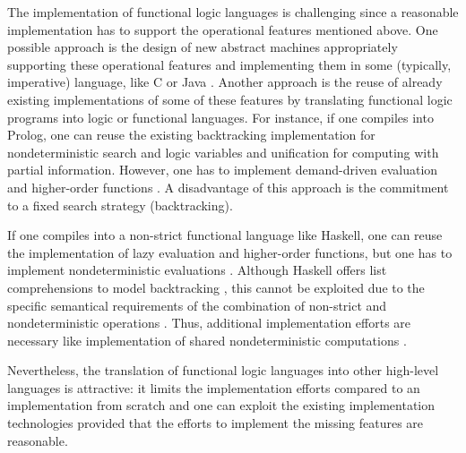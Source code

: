 \documentclass{llncs}
\begin{document}
The implementation of functional logic languages is challenging
since a reasonable implementation has to support the operational
features mentioned above.
One possible approach
is the design of new abstract machines appropriately supporting
these operational features and implementing them in some (typically,
imperative) language, like C \cite{Lux99FLOPS}
or Java \cite{AntoyHanusLiuTolmach05,HanusSadre99JFLP}.
Another approach is the reuse of already existing implementations
of some of these features by translating
functional logic programs into logic or functional languages.
For instance, if one compiles into Prolog, one can reuse
the existing backtracking implementation for nondeterministic
search and logic variables and unification for computing with partial
information. However, one has to implement demand-driven evaluation
and higher-order functions \cite{AntoyHanus00FROCOS}.
A disadvantage of this approach is the commitment to a fixed
search strategy (backtracking).

If one compiles into a non-strict functional language like Haskell,
one can reuse the implementation
of lazy evaluation and higher-order functions, but one has
to implement nondeterministic evaluations
\cite{BrasselFischerHanusReck11,BrasselHuch07}.
Although Haskell offers list comprehensions to model
backtracking \cite{Wadler85}, this cannot be exploited
due to the specific semantical requirements of the combination
of non-strict and nondeterministic operations
\cite{GonzalezEtAl99}. Thus, additional implementation efforts
are necessary like implementation of shared
nondeterministic computations \cite{FischerKiselyovShan09}.

Nevertheless, the translation of functional logic languages
into other high-level languages is attractive:
it limits the implementation efforts compared to an implementation
from scratch and one can exploit the existing implementation technologies
provided that the efforts to implement the missing features
are reasonable.
\end{document}
